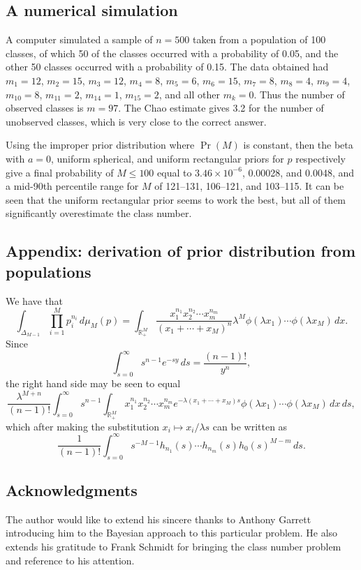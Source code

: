 \documentclass{amsart}
\begin{document}
\subsection*{A numerical simulation}

A computer simulated a sample of $n=500$ taken
from a population of 100 classes,
of which 50 of the classes occurred with 
a probability of 0.05, and the other 50
classes occurred with a probability of 0.15.  The data obtained had
$m_1 = 12$, $m_2 = 15$, $m_3 = 12$, $m_4 = 8$, 
$m_5 = 6$, $m_6 = 15$, $m_7 = 8$, $m_8 = 4$, $m_9 = 4$, 
$m_{10} = 8$, $m_{11} = 2$, $m_{14} = 1$, $m_{15} = 2$, and all other
$m_k = 0$.  Thus the number of observed classes is $m=97$.  
The Chao estimate
gives 3.2 for the number of unobserved classes, which
is very close to the correct answer.

Using the improper prior distribution where $\Pr(M)$ is constant,
then
the beta with $a=0$, uniform spherical, and uniform
rectangular priors for $p$ respectively 
give a final probability of $M \le 100$ equal to
$3.46\times10^{-6}$, 0.00028, and 0.0048, and a mid-90th
percentile range for $M$ of 121--131, 106--121, and 103--115.
It can
be seen that the uniform rectangular prior seems to work the best, but all
of them significantly overestimate the class number.

\subsection*{Appendix: derivation of prior distribution from populations}

We have that
$$ \int_{\Delta_{M-1}} \prod_{i=1}^M p_i^{n_i} \, d\mu_M(p) = 
   \int_{\mathbb R_+^M}
   \frac{x_1^{n_1} x_2^{n_2} \cdots x_m^{n_m}}
   {(x_1+\cdots+x_M)^n} \lambda^M \phi(\lambda x_1) \cdots \phi(\lambda x_M)
   \, dx .$$
Since
$$ \int_{s=0}^\infty s^{n-1} e^{-s y} \, ds = \frac{(n-1)!}{y^n}  ,$$
the right hand side may be seen to equal
$$ \frac{\lambda^{M+n}}{(n-1)!} \int_{s=0}^\infty s^{n-1}
   \int_{\mathbb R_+^M}
   {x_1^{n_1} x_2^{n_2} \cdots x_m^{n_m}}
   e^{-\lambda (x_1+\cdots+x_M) s}
   \phi(\lambda x_1) \cdots \phi(\lambda x_M)
   \, dx \, ds ,$$
which after making the substitution $x_i \mapsto x_i/\lambda s$ can be
written as
$$ \frac1{(n-1)!} \int_{s=0}^\infty s^{-M-1}
    h_{n_1}(s) \cdots h_{n_m}(s) h_0(s)^{M-m} \, ds .$$

\subsection*{Acknowledgments} The author would like to extend his sincere 
thanks to Anthony Garrett introducing him to the Bayesian approach to
this particular problem.  He also extends his gratitude to Frank Schmidt
for bringing the class number problem and reference \cite{chao84} to
his attention.
\end{document}
